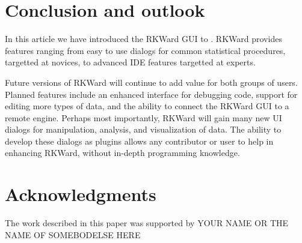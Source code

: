 \section{Conclusion and outlook}
\label{sec:conclusion_summary}
In this article we have introduced the RKWard GUI to . RKWard provides features ranging
from easy to use dialogs for common statistical procedures, targetted at  novices, to advanced
IDE features targetted at  experts.

Future versions of RKWard will continue to add value for both groups of users. Planned features include
an enhanced interface for debugging  code, support for editing more types of data, and the
ability to connect the RKWard GUI to a remote  engine. Perhaps most importantly, RKWard will
gain many new UI dialogs for manipulation, analysis, and visualization of data. The ability to
develop these dialogs as plugins allows any contributor or user to help in enhancing RKWard, without in-depth
programming knowledge.

\section{Acknowledgments}
\label{sec:acknowledgments}
The work described in this paper was supported by YOUR NAME OR THE NAME
OF SOMEBODELSE HERE